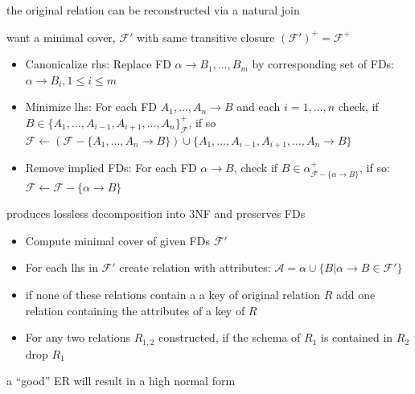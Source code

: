 \documentclass{scrartcl}
\begin{document}
\begin{description}
	the original relation can be reconstructed via a natural join
	\item[Normalisation]
	\item[minimal cover:] want a minimal cover, $\mathcal{F}'$ with same transitive closure $(\mathcal{F}')^+=\mathcal{F}^+$
	\begin{itemize}
		\item Canonicalize rhs: Replace FD $\alpha\to B_1,\dots,B_m$ by corresponding set of FDs: $\alpha\to B_i,1\leq i\leq m$
		\item Minimize lhs: For each FD $A_1,\dots,A_n\to B$ and each $i=1,\dots,n$ check, if $B\in\{A_1,\dots,A_{i-1},A_{i+1},\dots,A_n\}^+_\mathcal{F}$, if so $\mathcal{F}\leftarrow(\mathcal{F}-\{A_1,\dots,A_n\to B\})\cup\{A_1,\dots,A_{i-1},A_{i+1},\dots,A_n\to B\}$
		\item Remove implied FDs: For each FD $\alpha\to B$, check if $B\in\alpha^+_{\mathcal{F}-\{\alpha\to B\}}$, if so: $\mathcal{F}\leftarrow \mathcal{F}-\{\alpha\to B\}$
	\end{itemize}
	\item[3NF synthesis algorithm] produces lossless decomposition into 3NF and preserves FDs
	\begin{itemize}
		\item Compute minimal cover of given FDs $\mathcal{F}'$
		\item For each lhs in $\mathcal{F}'$ create relation with attributes: $\mathcal{A}=\alpha\cup\{ B\vert\alpha\to B\in\mathcal{F}' \}$
		\item if none of these relations contain a a key of original relation $R$ add one relation containing the attributes of a key of $R$
		\item For any two relations $R_{1,2}$ constructed, if the schema of $R_1$ is contained in $R_2$ drop $R_1$
	\end{itemize}
	\item a "`good"' ER will result in a high normal form
\end{description}
\end{document}
